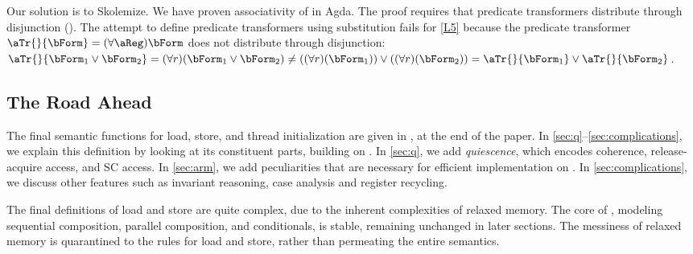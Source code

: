 \begin{example}
  Our solution is to Skolemize.  We have proven associativity of
   in Agda.  The proof requires that predicate
  transformers distribute through disjunction ().  The
  attempt to define predicate transformers using substitution fails for
  \ref{L5} because the predicate transformer
  $\aTr{}{\bForm}=(\forall\aReg)\bForm$ does not distribute through
  disjunction:
  \begin{math}
    \aTr{}{\bForm_1\lor \bForm_2}=
    (\forall r)(\bForm_1\lor \bForm_2)
    \neq
    ((\forall r)(\bForm_1)) \lor ((\forall r)(\bForm_2))
    = \aTr{}{\bForm_1} \lor \aTr{}{\bForm_2}
  \end{math}.
\end{example}

\subsection{The Road Ahead}

The final semantic functions for load, store, and thread initialization are
given in , at the end of the paper.  In
\textsection\ref{sec:q}--\ref{sec:complications}, we explain this definition
by looking at its constituent parts, building on .
In \textsection\ref{sec:q}, we add \emph{quiescence}, which encodes
coherence, release-acquire access, and SC access.  In
\textsection\ref{sec:arm}, we add peculiarities that are necessary for
efficient implementation on \armeight.  In
\textsection\ref{sec:complications}, we discuss other features such as
invariant reasoning, case analysis and register recycling.

The final definitions of load and store are quite complex, due to the
inherent complexities of relaxed memory.  The core of
, modeling sequential composition, parallel
composition, and conditionals, is stable, remaining unchanged in later
sections.  The messiness of relaxed memory is quarantined to the rules
for load and store, rather than permeating the entire semantics.
